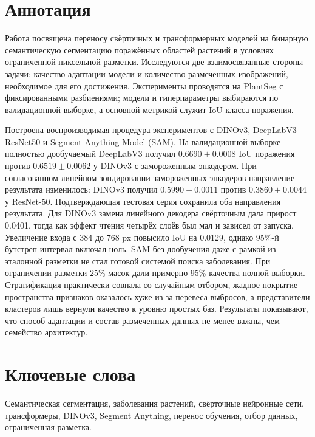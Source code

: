 \documentclass[a4paper,12pt]{extarticle}
\begin{document}

\newpage
\setcounter{page}{2}

{\hypersetup{linkcolor=black}\tableofcontents}

\newpage
\section*{Аннотация}

Работа посвящена переносу свёрточных и трансформерных моделей на бинарную
семантическую сегментацию поражённых областей растений в условиях ограниченной
пиксельной разметки. Исследуются две взаимосвязанные стороны задачи: качество
адаптации модели и количество размеченных изображений, необходимое для его
достижения. Эксперименты проводятся на PlantSeg с фиксированными разбиениями;
модели и гиперпараметры выбираются по валидационной выборке, а основной метрикой служит
IoU класса поражения.

Построена воспроизводимая процедура экспериментов с DINOv3,
DeepLabV3-ResNet50 и Segment Anything Model (SAM). На валидационной выборке
полностью дообучаемый DeepLabV3 получил $0.6690\pm0.0008$ IoU поражения против
$0.6519\pm0.0062$ у DINOv3 с замороженным энкодером. При согласованном
линейном зондировании замороженных энкодеров направление результата изменилось:
DINOv3 получил $0.5990\pm0.0011$ против $0.3860\pm0.0044$ у ResNet-50.
Подтверждающая тестовая серия сохранила оба направления результата.
Для DINOv3 замена линейного декодера свёрточным дала прирост 0.0401, тогда как
эффект чтения четырёх слоёв был мал и зависел от запуска. Увеличение входа с
384 до 768 px повысило IoU на 0.0129, однако 95\%-й бутстреп-интервал включал
ноль. SAM без
дообучения даже с рамкой из эталонной разметки не стал готовой системой поиска
заболевания. При ограничении разметки 25\% масок дали примерно 95\% качества
полной выборки. Стратификация практически совпала со случайным отбором, жадное
покрытие пространства признаков оказалось хуже из-за перевеса выбросов, а
представители кластеров лишь вернули качество к уровню простых баз. Результаты
показывают, что способ адаптации и состав размеченных данных не менее важны,
чем семейство архитектур.

\section*{Ключевые слова}

Семантическая сегментация, заболевания растений, свёрточные нейронные сети,
трансформеры, DINOv3, Segment Anything, перенос обучения, отбор данных,
ограниченная разметка.
\end{document}
